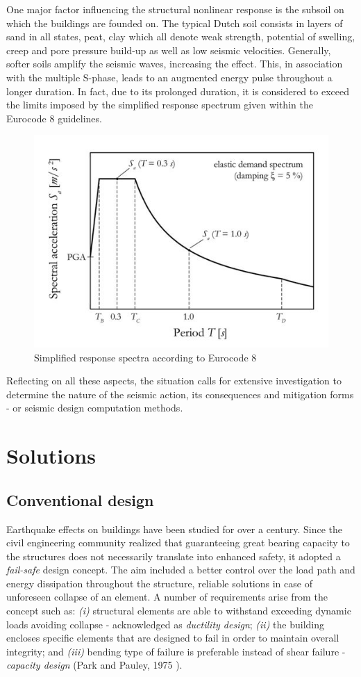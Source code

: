 \documentclass[11pt,a4paper]{report}
\begin{document}
One major factor influencing the structural nonlinear response is the subsoil on which the buildings are founded on. The typical Dutch soil consists in layers of sand in all states, peat, clay which all denote weak strength, potential of swelling, creep and pore pressure build-up as well as low seismic velocities. Generally, softer soils amplify the seismic waves, increasing the effect. This, in association with the multiple S-phase, leads to an augmented energy pulse throughout a longer duration. In fact, due to its prolonged duration, it is considered to exceed the limits imposed by the simplified response spectrum given within the Eurocode 8 guidelines.
\begin{figure}[h!]
	\centering
	\includegraphics[width=0.42\linewidth]{"spectrum_code"}
	\caption{Simplified response spectra according to Eurocode 8}
	\label{SA}
\end{figure}

Reflecting on all these aspects, the situation calls for extensive investigation to determine the nature of the seismic action, its consequences and mitigation forms - or seismic design computation methods. 

\section{Solutions}
\subsection{Conventional design}
Earthquake effects on buildings have been studied for over a century. Since the civil engineering community realized that guaranteeing great bearing capacity to the structures does not necessarily translate into enhanced safety, it adopted a \textit{fail-safe} design concept. The aim included a better control over the load path and energy dissipation throughout the structure, reliable solutions in case of unforeseen collapse of an element. A number of requirements arise from the concept such as: \textit{(i)} structural elements are able to withstand exceeding dynamic loads avoiding collapse - acknowledged as \textit{ductility design}; \textit{(ii)} the building encloses specific elements that are designed to fail in order to maintain overall integrity; and \textit{(iii)} bending type of failure is preferable instead of shear failure - \textit{capacity design} (Park and Pauley, 1975 \cite{park1984seismic}).
\end{document}
